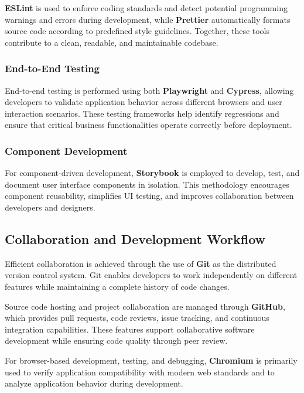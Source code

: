 \textbf{ESLint} is used to enforce coding standards and detect potential programming warnings and errors during development, while \textbf{Prettier} automatically formats source code according to predefined style guidelines. Together, these tools contribute to a clean, readable, and maintainable codebase.

\subsubsection{End-to-End Testing}

End-to-end testing is performed using both \textbf{Playwright} and \textbf{Cypress}, allowing developers to validate application behavior across different browsers and user interaction scenarios. These testing frameworks help identify regressions and ensure that critical business functionalities operate correctly before deployment.

\subsubsection{Component Development}

For component-driven development, \textbf{Storybook} is employed to develop, test, and document user interface components in isolation. This methodology encourages component reusability, simplifies \acs{UI} testing, and improves collaboration between developers and designers.

\subsection{Collaboration and Development Workflow}

Efficient collaboration is achieved through the use of \textbf{Git} as the distributed version control system. Git enables developers to work independently on different features while maintaining a complete history of code changes.

Source code hosting and project collaboration are managed through \textbf{GitHub}, which provides pull requests, code reviews, issue tracking, and continuous integration capabilities. These features support collaborative software development while ensuring code quality through peer review.

For browser-based development, testing, and debugging, \textbf{Chromium} is primarily used to verify application compatibility with modern web standards and to analyze application behavior during development.

